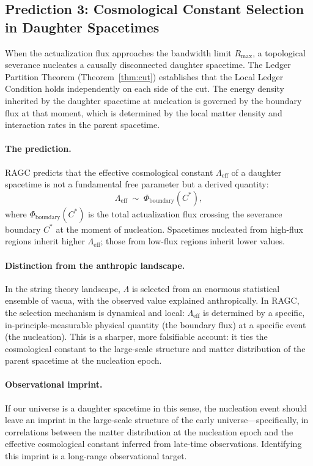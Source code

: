 \documentclass[11pt,a4paper]{article}
\theoremstyle{plain}
\theoremstyle{definition}
\theoremstyle{remark}
\newcommand{\Rmax}{R_{\mathrm{max}}}
\begin{document}
\subsection{Prediction 3: Cosmological Constant Selection in Daughter Spacetimes}

When the actualization flux approaches the bandwidth limit $\Rmax$, a topological
severance nucleates a causally disconnected daughter spacetime. The Ledger Partition
Theorem (Theorem~\ref{thm:cut}) establishes that the Local Ledger Condition holds
independently on each side of the cut. The energy density inherited by the daughter
spacetime at nucleation is governed by the boundary flux at that moment, which is
determined by the local matter density and interaction rates in the parent
spacetime.

\paragraph{The prediction.}
RAGC predicts that the effective cosmological constant $\Lambda_{\mathrm{eff}}$ of
a daughter spacetime is not a fundamental free parameter but a derived quantity:
\begin{equation}
  \Lambda_{\mathrm{eff}} \;\sim\; \Phi_{\mathrm{boundary}}(C^*),
\end{equation}
where $\Phi_{\mathrm{boundary}}(C^*)$ is the total actualization flux crossing the
severance boundary $C^*$ at the moment of nucleation. Spacetimes nucleated from
high-flux regions inherit higher $\Lambda_{\mathrm{eff}}$; those from low-flux
regions inherit lower values.

\paragraph{Distinction from the anthropic landscape.}
In the string theory landscape, $\Lambda$ is selected from an enormous statistical
ensemble of vacua, with the observed value explained anthropically. In RAGC, the
selection mechanism is dynamical and local: $\Lambda_{\mathrm{eff}}$ is determined
by a specific, in-principle-measurable physical quantity (the boundary flux) at a
specific event (the nucleation). This is a sharper, more falsifiable account: it
ties the cosmological constant to the large-scale structure and matter distribution
of the parent spacetime at the nucleation epoch.

\paragraph{Observational imprint.}
If our universe is a daughter spacetime in this sense, the nucleation event should
leave an imprint in the large-scale structure of the early universe---specifically,
in correlations between the matter distribution at the nucleation epoch and the
effective cosmological constant inferred from late-time observations. Identifying
this imprint is a long-range observational target.
\end{document}
